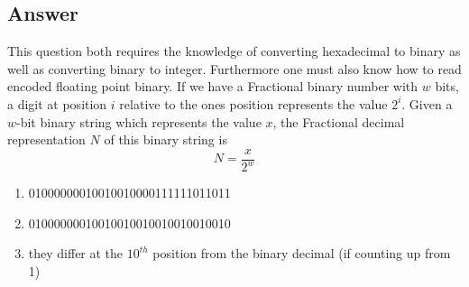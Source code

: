 \documentclass[12pt]{book}
\begin{document}
\subsection*{Answer}
This question both requires the knowledge of converting hexadecimal to binary as well as converting binary to integer.
Furthermore one must also know how to read encoded floating point binary.
If we have a Fractional binary number with $w$ bits, a digit at position $i$ relative to the ones position represents
        the value  $2^i$. 
Given a $w$-bit binary string which represents the value  $x$, the Fractional decimal representation $N$ of this binary string is
\[N = \frac{x}{2^w}\]

\begin{enumerate}
        \item 01000000010010010000111111011011
        \item 01000000010010010010010010010010
        \item they differ at the $10^{th}$ position from the binary decimal (if counting up from 1)

\end{enumerate}
\end{document}
